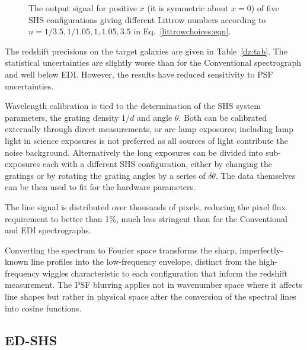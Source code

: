 \documentclass[preprint2, 10pt]{aastex}
\begin{document}
\begin{figure}[t]
   \centering
   \caption{The output signal for positive $x$ (it is symmetric about 
$x=0$) of five SHS configurations giving different
   Littrow numbers according to 
   $n=1/3.5, 1/1.05, 1, 1.05, 3.5$  in Eq.~\ref{littrowchoices:eqn}. 
   \label{shscounts:fig}}
\end{figure}

The redshift precisions on the target galaxies are given in Table~\ref{dz:tab}.  The statistical uncertainties are slightly worse than for
the Conventional spectrograph and well below EDI.  However, the results have reduced sensitivity to PSF uncertainties.

Wavelength calibration is tied to the determination of the SHS system parameters, the grating density $1/d$ and angle $\theta$.
Both can be calibrated externally through direct measurements, or arc lamp exposures; including lamp light
in science exposures is not preferred as all sources of light contribute the noise background.
Alternatively
the long exposures can be divided into sub-exposures each with a different SHS configuration, either by changing the
gratings or by rotating the grating angles by a series of $\delta \theta$.  The data themselves can be then used to fit for
the hardware parameters.

The line signal is distributed over thousands of pixels, reducing the pixel flux requirement to better than 1\%, much less stringent
than for the Conventional and EDI spectrographs.

Converting the spectrum to Fourier space transforms the sharp, imperfectly-known line profiles into the low-frequency envelope,
distinct from the high-frequency wiggles characteristic to each configuration that inform the redshift measurement.
The PSF blurring applies not in wavenumber space where it affects
line shapes but rather in physical space after the conversion of the spectral lines into cosine functions. 


\subsection{ED-SHS} 
\end{document}
